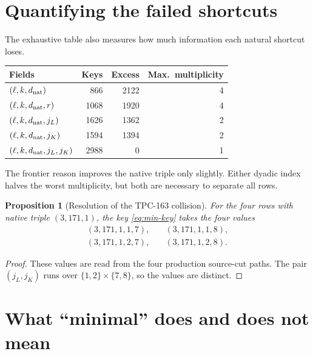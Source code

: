 \documentclass[11pt]{article}
\newtheorem{proposition}[theorem]{Proposition}
\theoremstyle{definition}
\theoremstyle{remark}
\begin{document}
\section{Quantifying the failed shortcuts}

The exhaustive table also measures how much information each natural
shortcut loses.
\begin{center}
\begin{tabular}{@{}lrrr@{}}
\toprule
\textbf{Fields} & \textbf{Keys} & \textbf{Excess} &
 \textbf{Max.\ multiplicity}\\
\midrule
\((\ell,k,d_{\rm nat})\) & 866 & 2122 & 4\\
\((\ell,k,d_{\rm nat},r)\) & 1068 & 1920 & 4\\
\((\ell,k,d_{\rm nat},j_L)\) & 1626 & 1362 & 2\\
\((\ell,k,d_{\rm nat},j_K)\) & 1594 & 1394 & 2\\
\((\ell,k,d_{\rm nat},j_L,j_K)\) & 2988 & 0 & 1\\
\bottomrule
\end{tabular}
\end{center}
The frontier reason improves the native triple only slightly.  Either
dyadic index halves the worst multiplicity, but both are necessary to
separate all rows.

\begin{proposition}[Resolution of the TPC-163 collision]\label{prop:four}
For the four rows with native triple \((3,171,1)\), the key
\eqref{eq:min-key} takes the four values
\[
\begin{split}
(3,171,1,1,7),\quad &(3,171,1,1,8),\\
(3,171,1,2,7),\quad &(3,171,1,2,8).
\end{split}
\]
\end{proposition}

\begin{proof}
These values are read from the four production source-cut paths.  The
pair \((j_L,j_K)\) runs over
\(\{1,2\}\times\{7,8\}\), so the values are distinct.
\end{proof}

\section{What ``minimal'' does and does not mean}
\end{document}
